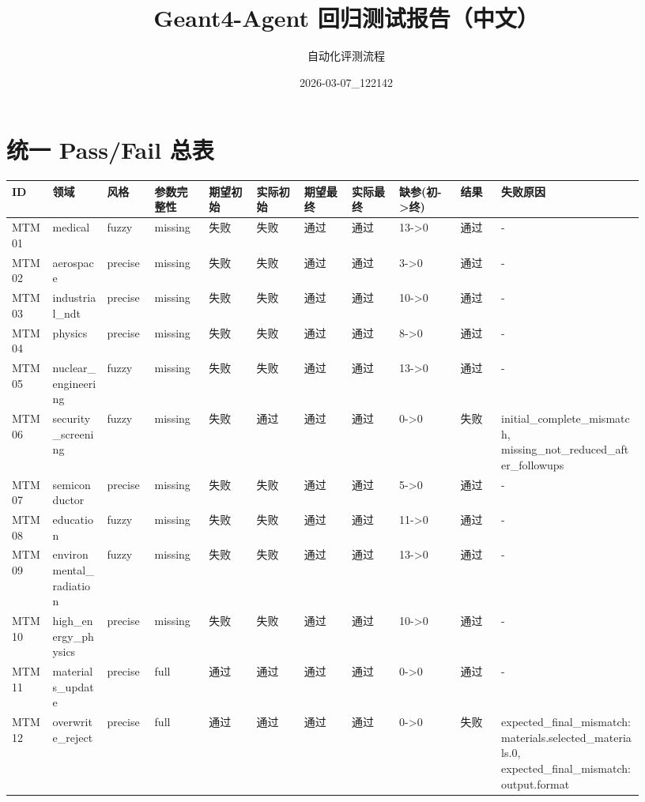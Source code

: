 \documentclass[11pt]{ctexart}
\title{Geant4-Agent 回归测试报告（中文）}
\author{自动化评测流程}
\date{2026-03-07\_122142}
\begin{document}
\maketitle
\section{统一 Pass/Fail 总表}
\begin{longtable}{p{0.06\linewidth}p{0.08\linewidth}p{0.07\linewidth}p{0.08\linewidth}p{0.07\linewidth}p{0.07\linewidth}p{0.07\linewidth}p{0.07\linewidth}p{0.09\linewidth}p{0.06\linewidth}p{0.21\linewidth}}
\toprule
ID & 领域 & 风格 & 参数完整性 & 期望初始 & 实际初始 & 期望最终 & 实际最终 & 缺参(初->终) & 结果 & 失败原因 \\
\midrule
MTM01 & medical & fuzzy & missing & 失败 & 失败 & 通过 & 通过 & 13->0 & 通过 & - \\
MTM02 & aerospace & precise & missing & 失败 & 失败 & 通过 & 通过 & 3->0 & 通过 & - \\
MTM03 & industrial\_ndt & precise & missing & 失败 & 失败 & 通过 & 通过 & 10->0 & 通过 & - \\
MTM04 & physics & precise & missing & 失败 & 失败 & 通过 & 通过 & 8->0 & 通过 & - \\
MTM05 & nuclear\_engineering & fuzzy & missing & 失败 & 失败 & 通过 & 通过 & 13->0 & 通过 & - \\
MTM06 & security\_screening & fuzzy & missing & 失败 & 通过 & 通过 & 通过 & 0->0 & 失败 & initial\_complete\_mismatch, missing\_not\_reduced\_after\_followups \\
MTM07 & semiconductor & precise & missing & 失败 & 失败 & 通过 & 通过 & 5->0 & 通过 & - \\
MTM08 & education & fuzzy & missing & 失败 & 失败 & 通过 & 通过 & 11->0 & 通过 & - \\
MTM09 & environmental\_radiation & fuzzy & missing & 失败 & 失败 & 通过 & 通过 & 13->0 & 通过 & - \\
MTM10 & high\_energy\_physics & precise & missing & 失败 & 失败 & 通过 & 通过 & 10->0 & 通过 & - \\
MTM11 & materials\_update & precise & full & 通过 & 通过 & 通过 & 通过 & 0->0 & 通过 & - \\
MTM12 & overwrite\_reject & precise & full & 通过 & 通过 & 通过 & 通过 & 0->0 & 失败 & expected\_final\_mismatch:materials.selected\_materials.0, expected\_final\_mismatch:output.format \\
\bottomrule
\end{longtable}
\end{document}
